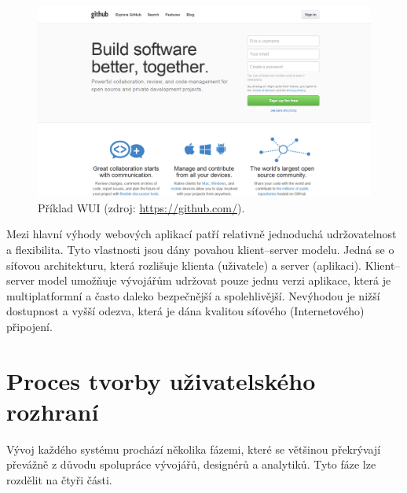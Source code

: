 \begin{figure}[htbp]
    \centering
    \includegraphics[width=\textwidth]{images/wui-example.png}
    \caption{Příklad WUI (zdroj: \url{https://github.com/}).}
\end{figure}

Mezi hlavní výhody webových aplikací patří relativně jednoduchá udržovatelnost a flexibilita. Tyto vlastnosti jsou dány povahou klient--server modelu. Jedná se o síťovou architekturu, která rozlišuje klienta (uživatele) a server (aplikaci). Klient--server model umožňuje vývojářům udržovat pouze jednu verzi aplikace, která je multiplatformní a často daleko bezpečnější a spolehlivější. Nevýhodou je nižší dostupnost a vyšší odezva, která je dána kvalitou síťového (Internetového) připojení.

\section{Proces tvorby uživatelského rozhraní}
\label{sec:process}

\begin{quote}
 \cite{5}
\end{quote}

\noindent
Vývoj každého systému prochází několika fázemi, které se většinou překrývají převážně z důvodu spolupráce vývojářů, designérů a analytiků. Tyto fáze lze rozdělit na čtyři části.

